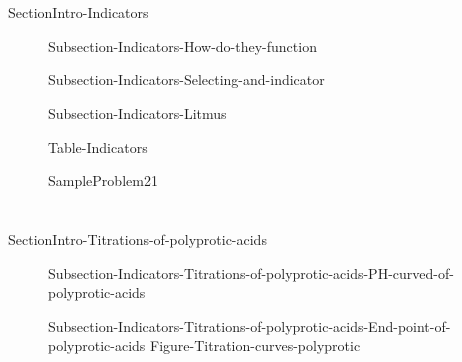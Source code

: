 \documentclass[main.tex]{subfiles}
\newcommand\chapterlabel{Ch-acidbase}\setcounter{figurenewcounter}{0}\setcounter{tablenewcounter}{0}\setcounter{formulanewcounter}{0}
\begin{document}
  \section{\color{blue!30!black}{Indicators}}{SectionIntro-Indicators}
\sloppy\begin{description}
\item[] {Subsection-Indicators-How-do-they-function}
\item[] {Subsection-Indicators-Selecting-and-indicator}
   \item[] {Subsection-Indicators-Litmus}

  \vspace{0cm} \hspace{0cm} {Table-Indicators} 

   {SampleProblem21}

 \end{description}
 
 
  \section{\color{blue!30!black}{Titrations of polyprotic acids}}{SectionIntro-Titrations-of-polyprotic-acids}
\sloppy\begin{description}
\item[] {Subsection-Indicators-Titrations-of-polyprotic-acids-PH-curved-of-polyprotic-acids}
\item[] {Subsection-Indicators-Titrations-of-polyprotic-acids-End-point-of-polyprotic-acids}
  {Figure-Titration-curves-polyprotic}

 \end{description}
 
\end{document}
